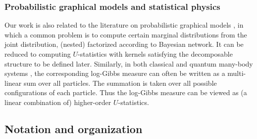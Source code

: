\documentclass[letterpaper,11pt]{article}
\newcommand{\Zhang}[1]{{\color{blue}{Zhang: #1}}}
\begin{document}
\begin{bibunit}[plainnat]
\subsubsection*{Probabilistic graphical models and statistical physics}

Our work is also related to the literature on probabilistic graphical models \citep{pearl1988probabilistic, shpitser2011efficient}, in which a common problem is to compute certain marginal distributions from the joint distribution, (nested) factorized according to Bayesian network. It can be reduced to computing $U$-statistics with kernels satisfying the decomposable structure to be defined later. Similarly, in both classical \citep{talagrand2010mean, li2020random} and quantum many-body systems \citep{bernaschi2024quantum}, the corresponding log-Gibbs measure can often be written as a multi-linear sum over all particles. The summation is taken over all possible configurations of each particle. Thus the log-Gibbs measure can be viewed as (a linear combination of) higher-order $U$-statistics.





\subsection*{Notation and organization}


\end{bibunit}
\end{document}
